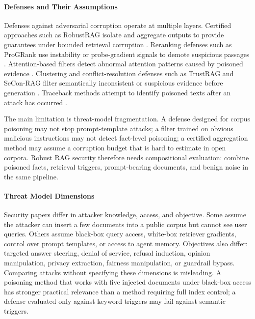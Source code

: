 \paragraph{Defenses and Their Assumptions}

Defenses against adversarial corruption operate at multiple layers. Certified approaches such as RobustRAG isolate and aggregate outputs to provide guarantees under bounded retrieval corruption \citep{certifiedRAG2024}. Reranking defenses such as ProGRank use instability or probe-gradient signals to demote suspicious passages \citep{rrag004}. Attention-based filters detect abnormal attention patterns caused by poisoned evidence \citep{rrag015}. Clustering and conflict-resolution defenses such as TrustRAG and SeCon-RAG filter semantically inconsistent or suspicious evidence before generation \citep{rrag013,rrag017}. Traceback methods attempt to identify poisoned texts after an attack has occurred \citep{rrag128}.

The main limitation is threat-model fragmentation. A defense designed for corpus poisoning may not stop prompt-template attacks; a filter trained on obvious malicious instructions may not detect fact-level poisoning; a certified aggregation method may assume a corruption budget that is hard to estimate in open corpora. Robust RAG security therefore needs compositional evaluation: combine poisoned facts, retrieval triggers, prompt-bearing documents, and benign noise in the same pipeline.

\paragraph{Threat Model Dimensions}

Security papers differ in attacker knowledge, access, and objective. Some assume the attacker can insert a few documents into a public corpus but cannot see user queries. Others assume black-box query access, white-box retriever gradients, control over prompt templates, or access to agent memory. Objectives also differ: targeted answer steering, denial of service, refusal induction, opinion manipulation, privacy extraction, fairness manipulation, or guardrail bypass. Comparing attacks without specifying these dimensions is misleading. A poisoning method that works with five injected documents under black-box access has stronger practical relevance than a method requiring full index control; a defense evaluated only against keyword triggers may fail against semantic triggers.

